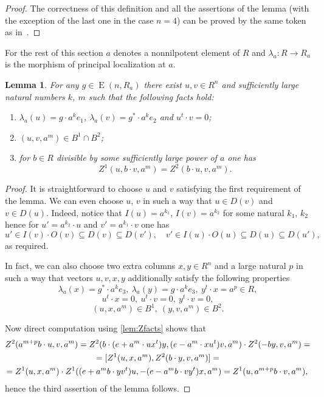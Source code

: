 \documentclass[oneside,12pt]{amsart}
\numberwithin{equation}{section}
\newtheorem{lem}{Lemma}
\numberwithin{lem}{section}
\theoremstyle{definition}
\theoremstyle{remark}
\DeclareMathOperator{\EE}{E}
\begin{document}
\begin{appendices}
\begin{proof}
The correctness of this definition and all the assertions of the lemma (with the exception of the last one in the case $n=4$) can be proved by the same token as in~\cite[Lemma~1.3]{Tu}.
\end{proof}

For the rest of this section $a$ denotes a nonnilpotent element of $R$ and $\lambda_a \colon R \rightarrow R_a$ is the morphism of principal localization at $a$.
\begin{lem} \label{lem:rk3rels} For any $g \in \EE(n, R_a)$ there exist $u, v \in R^n$ and sufficiently large natural numbers $k$, $m$ such that the following facts hold:
\begin{enumerate}
 \item $\lambda_a(u) = g \cdot a^k e_1$, $\lambda_a(v) = g^* \cdot a^k e_2$ and $u^t \cdot v = 0$;
 \item $(u, v, a^m) \in B^1 \cap B^2$;
 \item for $b \in R$ divisible by some sufficiently large power of $a$ one has
             $$Z^1(u, b \cdot v, a^m) = Z^2(b \cdot u, v, a^m).$$
\end{enumerate}
\end{lem}
\begin{proof}
It is straightforward to choose $u$ and $v$ satisfying the first requirement of the lemma.
We can even choose $u$, $v$ in such a way that $u \in D(v)$ and $v \in D(u)$.
Indeed, notice that $I(u) = a^{k_1}$, $I(v) = a^{k_2}$ for some natural $k_1$, $k_2$ hence for $u' = a^{k_2} \cdot u$ and $v' = a^{k_1} \cdot v$ one has
$$u' \in I(v) \cdot O(v) \subseteq D(v) \subseteq D(v'),\quad v' \in I(u) \cdot O(u) \subseteq D(u) \subseteq D(u'),$$
as required.

In fact, we can also choose two extra columns $x, y \in R^n$ and a large natural $p$ in such a way that vectors $u,v,x,y$ additionally satisfy the following properties
\begin{equation*} \lambda_a(x) = g^* \cdot a^k e_3,\ \lambda_a(y) = g \cdot a^k e_3,\ y^t \cdot x = a^p \in R, \end{equation*}
\begin{equation*} u^t \cdot x = 0,\ u^t \cdot v = 0,\ y^t \cdot v = 0, \end{equation*}
\begin{equation*} (u, x, a^m) \in B^1,\ (y, v, a^m) \in B^2. \end{equation*}

Now direct computation using \cref{lem:Zfacts} shows that
 \begin{multline*}
 Z^2(a^{m+p}b \cdot u, v, a^m) = Z^2(b \cdot (e+a^m \cdot ux^t)y, (e-a^m \cdot xu^t)v,a^m) \cdot Z^2(-by,v,a^m) = \\
  = [Z^1(u, x, a^m), Z^2(b \cdot y, v, a^m)] = \\
    = Z^1(u,x,a^m) \cdot Z^1((e+a^mb \cdot yv^t)u,-(e- a^mb \cdot vy^t)x,a^m) = Z^1(u,a^{m+p}b \cdot v,a^m), \qedhere
 \end{multline*}
hence the third assertion of the lemma follows.
\end{proof}


\end{appendices}
\end{document}
